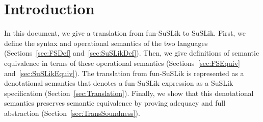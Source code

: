 \documentclass[10pt]{article}
\begin{document}
\section{Introduction}

In this document, we give a translation from fun-SuSLik to SuSLik. First, we define the syntax and
operational semantics of the two languages (Sections~\ref{sec:FSDef} and~\ref{sec:SuSLikDef}).
Then, we give definitions of semantic equivalence in terms of these
operational semantics (Sections~\ref{sec:FSEquiv} and~\ref{sec:SuSLikEquiv}). The translation from fun-SuSLik is represented as a denotational semantics
that denotes a fun-SuSLik expression as a SuSLik specification (Section~\ref{sec:Translation}). Finally, we show that this denotational
semantics preserves semantic equivalence by proving adequacy and full abstraction (Section~\ref{sec:TransSoundness}).
\\


%
%
%
%
%
%
%
\end{document}

